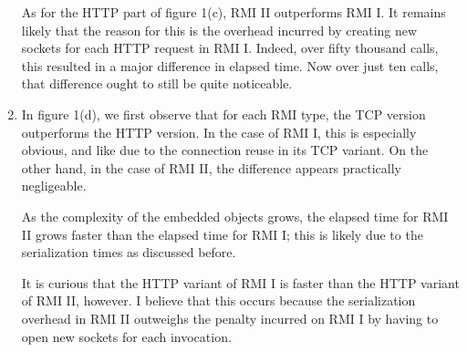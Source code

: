 \documentclass{article}
\begin{document}
\begin{enumerate}
        As for the HTTP part of figure 1(c), RMI II outperforms RMI I. It
        remains likely that the reason for this is the overhead incurred by
        creating new sockets for each HTTP request in RMI I. Indeed, over fifty
        thousand calls, this resulted in a major difference in elapsed time.
        Now over just ten calls, that difference ought to still be quite
        noticeable.

    \item
        In figure 1(d), we first observe that for each RMI type, the TCP
        version outperforms the HTTP version. In the case of RMI I, this is
        especially obvious, and like due to the connection reuse in its TCP
        variant. On the other hand, in the case of RMI II, the difference
        appears practically negligeable.

        As the complexity of the embedded objects grows, the elapsed time for
        RMI II grows faster than the elapsed time for RMI I; this is likely due
        to the serialization times as discussed before.

        It is curious that the HTTP variant of RMI I is faster than the HTTP
        variant of RMI II, however. I believe that this occurs because the
        serialization overhead in RMI II outweighs the penalty incurred on RMI
        I by having to open new sockets for each invocation.
\end{enumerate}
\end{document}
